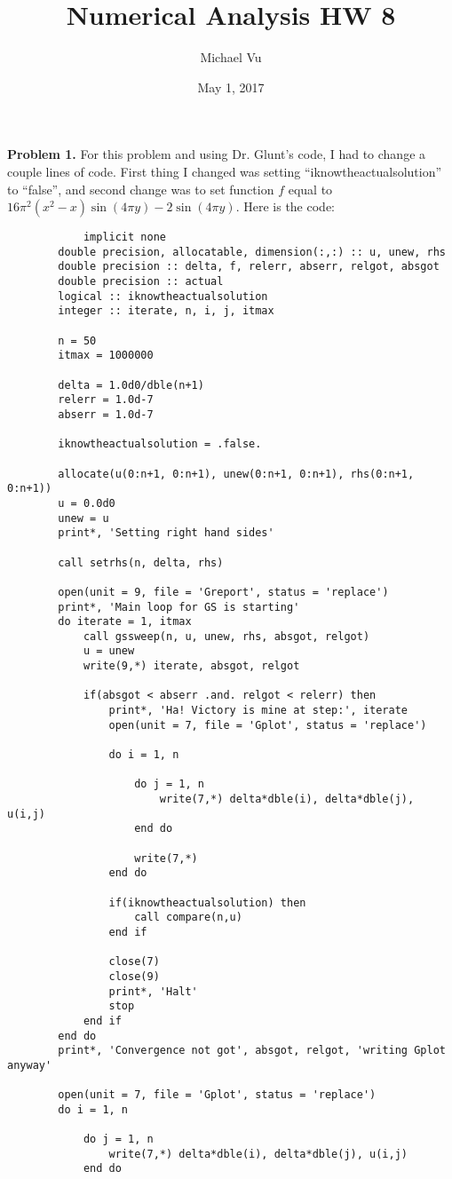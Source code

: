 \documentclass{article}
\title{Numerical Analysis HW 8}
\author{Michael Vu}
\date{May 1, 2017}
\begin{document}
	\maketitle
	
	\textbf{Problem 1.} For this problem and using Dr. Glunt's code, I had to change a couple lines of code. First thing I changed was setting ``iknowtheactualsolution'' to ``false'', and second change was to set function $f$ equal to $16\pi^2(x^2-x)\sin(4\pi y)-2\sin(4\pi y)$. Here is the code:
	
	
	\begin{verbatim}
			implicit none
		double precision, allocatable, dimension(:,:) :: u, unew, rhs
		double precision :: delta, f, relerr, abserr, relgot, absgot
		double precision :: actual
		logical :: iknowtheactualsolution
		integer :: iterate, n, i, j, itmax

		n = 50
		itmax = 1000000

		delta = 1.0d0/dble(n+1)
		relerr = 1.0d-7
		abserr = 1.0d-7

		iknowtheactualsolution = .false.

		allocate(u(0:n+1, 0:n+1), unew(0:n+1, 0:n+1), rhs(0:n+1, 0:n+1))
		u = 0.0d0
		unew = u 
		print*, 'Setting right hand sides'

		call setrhs(n, delta, rhs)

		open(unit = 9, file = 'Greport', status = 'replace')
		print*, 'Main loop for GS is starting'
		do iterate = 1, itmax
			call gssweep(n, u, unew, rhs, absgot, relgot)
			u = unew
			write(9,*) iterate, absgot, relgot
			
			if(absgot < abserr .and. relgot < relerr) then
				print*, 'Ha! Victory is mine at step:', iterate
				open(unit = 7, file = 'Gplot', status = 'replace')
				
				do i = 1, n 
					
					do j = 1, n
						write(7,*) delta*dble(i), delta*dble(j), u(i,j)
					end do
					
					write(7,*)
				end do
				
				if(iknowtheactualsolution) then
					call compare(n,u)
				end if
				
				close(7)
				close(9)
				print*, 'Halt'
				stop
			end if
		end do
		print*, 'Convergence not got', absgot, relgot, 'writing Gplot anyway'

		open(unit = 7, file = 'Gplot', status = 'replace')
		do i = 1, n
			
			do j = 1, n 
				write(7,*) delta*dble(i), delta*dble(j), u(i,j)
			end do
				

\end{verbatim}
\end{document}
